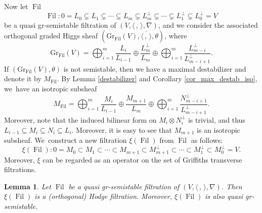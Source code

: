 \documentclass[11pt]{article}
\numberwithin{equation}{section}
\newcommand{\grsemistable}{gr\nobreakdash-semi\-stable\xspace}
\DeclareMathOperator{\Filt}{Fil}
\newcommand{\Gr}{\mathrm{Gr}}
\theoremstyle{plain}
\newtheorem{lem}[thm]{Lemma}
\theoremstyle{definition}
\begin{document}
Now let $\Filt$
\[
\Filt: 0= L_0 \subsetneq L_1 \subsetneq \cdots \subsetneq L_m \subsetneq L_m^\perp\subsetneq\cdots \subsetneq L_1^\perp\subsetneq L_0^\perp= V
\]
be a quasi \grsemistable filtration of $(V,\langle \,, \, \rangle,\nabla)$, and we consider the associated orthogonal graded Higgs sheaf $(\Gr_{\Filt}(V), \overline{\langle \,, \, \rangle},\theta)$, where
\[
\Gr_{\Filt}(V)=\mathop{\bigoplus}_{i=1}^{m} \frac{L_i}{L_{i-1}}\oplus \frac{L_m^\perp}{L_m}\oplus \mathop{\bigoplus}_{i=1}^{m} \frac{L_{m-i}^\perp}{L_{m-i+1}^\perp}.
\]
If $(\Gr_{\Filt}(V),\theta)$ is not semistable, then we have a maximal destabilizer and denote it by $M_{\Filt}$. By Lemma \ref{destabilizer} and Corollary \ref{cor_max_destab_iso}, we~have an isotropic subsheaf
\[
M_{\Filt}=\mathop{\bigoplus}_{i=1}^{m} \frac{M_i}{L_{i-1}}\oplus \frac{M_{m+1}}{L_m}\oplus \mathop{\bigoplus}_{i=1}^{m} \frac{N_{m-i+1}^\perp}{L_{m-i+1}^\perp}.
\]
Moreover, note that the induced bilinear form on $M_i \otimes N_i^{\perp}$ is trivial, and thus $L_{i-1} \subseteq M_i \subseteq N_i \subseteq L_i$. Moreover, it is easy to see that $M_{m+1}$ is an isotropic subsheaf. We~construct a new filtration $\xi(\Filt)$ from $\Filt$ as follows:
\[
\xi(\Filt):0=M_0\subset M_1\subset\cdots\subset M_{m+1}\subset M_{m+1}^\perp\subset\cdots\subset M_1^\perp\subset M_0^\perp=V.
\]
Moreover, $\xi$ can be regarded as an operator on the set of Griffiths transverse filtrations.

\begin{lem}\label{preserve}
Let $\Filt$ be a quasi \grsemistable filtration of $(V, \langle \,, \, \rangle, \nabla)$. Then $\xi(\Filt)$ is a (orthogonal) Hodge filtration. Moreover, $\xi(\Filt)$ is also quasi \grsemistable.
\end{lem}
\end{document}
